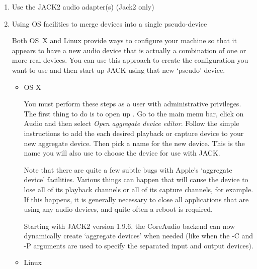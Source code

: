 \documentclass[10pt,a4paper]{book}
\newcommand{\button}[1]{#1}
\newcommand{\menu}[1]{\emph{\StrSubstitute{#1}{,}{ $\rightarrow$ }}}
\begin{document}
{\begin{enumerate}
\begin{listing}
man alsa\_in
\end{listing}

This page covers both clients, since their arguments are identical.

Note that you can use these clients even if you are running JACK with
a FFADO-supported device. The requirement for ALSA support only
applies to the extra devices you want to use, not the one that JACK
itself is using.

\item Use the JACK2 audio adapter(s) (Jack2 only)


\item Using OS facilities to merge devices into a single pseudo-device

Both OS~X and Linux provide ways to configure your machine so that it
appears to have a new audio device that is actually a combination of
one or more real devices. You can use this approach to create the
configuration you want to use and then start up JACK using that new
`pseudo' device.

\begin{itemize}
\item OS X

You must perform these steps as a user with administrative
privileges. The first thing to do is to open up
\menu{Applications,Utilities,Audio/MIDI Setup}. Go to the main menu
bar, click on \button{Audio} and then select \emph{Open aggregate device
editor}. Follow the simple instructions to add the each desired
playback or capture device to your new aggregate device. Then pick a
name for the new device. This is the name you will also use to choose
the device for use with JACK\@.

Note that there are quite a few subtle bugs with Apple's `aggregate
device' facilities. Various things can happen that will cause the
device to lose all of its playback channels or all of its capture
channels, for example. If this happens, it is generally necessary to
close all applications that are using any audio devices, and quite
often a reboot is required.

Starting with JACK2 version 1.9.6, the CoreAudio backend can now
dynamically create `aggregate devices' when needed (like when the -C
and -P arguments are used to specify the separated input and output
devices).

\item Linux


\end{itemize}
\end{enumerate}}
\end{document}
